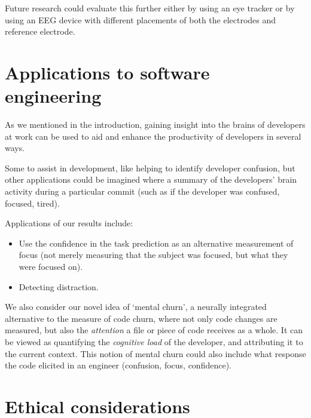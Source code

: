     Future research could evaluate this further either by using an eye tracker or by using an EEG device with different placements of both the electrodes and reference electrode.


\section{Applications to software engineering}

As we mentioned in the introduction, gaining insight into the brains of developers at work can be used to aid and enhance the productivity of developers in several ways.

Some to assist in development, like helping to identify developer confusion, but other applications could be imagined where a summary of the developers' brain activity during a particular commit (such as if the developer was confused, focused, tired).


Applications of our results include:

\begin{itemize}
    \item Use the confidence in the task prediction as an alternative measurement of focus (not merely measuring that the subject was focused, but what they were focused on). 
    \item Detecting distraction.
\end{itemize}

We also consider our novel idea of `mental churn', a neurally integrated alternative to the measure of code churn, where not only code changes are measured, but also the \emph{attention} a file or piece of code receives as a whole. It can be viewed as quantifying the \emph{cognitive load} of the developer, and attributing it to the current context. This notion of mental churn could also include what response the code elicited in an engineer (confusion, focus, confidence).

\section{Ethical considerations}

